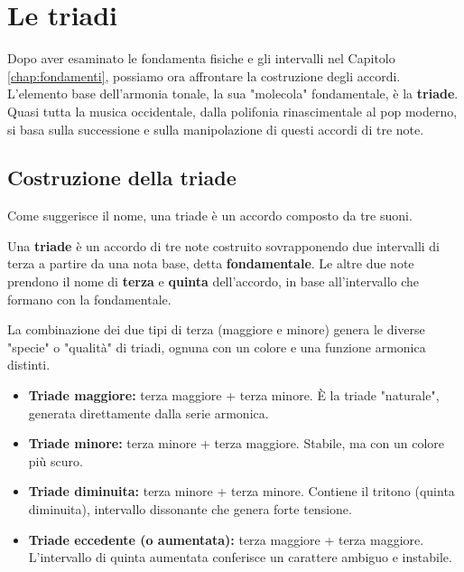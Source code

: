 \chapter{Le triadi}
\label{chap:triadi}

Dopo aver esaminato le fondamenta fisiche e gli intervalli nel Capitolo \ref{chap:fondamenti}, possiamo ora affrontare la costruzione degli accordi. L'elemento base dell'armonia tonale, la sua "molecola" fondamentale, è la \textbf{triade}. Quasi tutta la musica occidentale, dalla polifonia rinascimentale al pop moderno, si basa sulla successione e sulla manipolazione di questi accordi di tre note.

\section{Costruzione della triade}
\label{sec:costruzione_triade}

Come suggerisce il nome, una triade è un accordo composto da tre suoni.

\begin{definizione}[La triade]
	\label{def:triade}
	Una \textbf{triade} è un accordo di tre note costruito sovrapponendo due intervalli di terza a partire da una nota base, detta \textbf{fondamentale}. Le altre due note prendono il nome di \textbf{terza} e \textbf{quinta} dell'accordo, in base all'intervallo che formano con la fondamentale.
\end{definizione}

La combinazione dei due tipi di terza (maggiore e minore) genera le diverse "specie" o "qualità" di triadi, ognuna con un colore e una funzione armonica distinti.

\begin{definizione}
	\begin{itemize}
	\item \textbf{Triade maggiore:} terza maggiore + terza minore. È la triade "naturale", generata direttamente dalla serie armonica.
	\item \textbf{Triade minore:} terza minore + terza maggiore. Stabile, ma con un colore più scuro.
	\item \textbf{Triade diminuita:} terza minore + terza minore. Contiene il tritono (quinta diminuita), intervallo dissonante che genera forte tensione.
	\item \textbf{Triade eccedente (o aumentata):} terza maggiore + terza maggiore. L'intervallo di quinta aumentata conferisce un carattere ambiguo e instabile.
\end{itemize}
\end{definizione}

